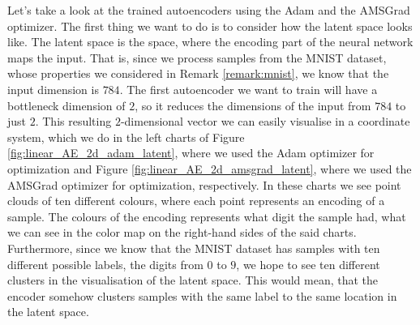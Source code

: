 Let's take a look at the trained autoencoders using the Adam and the AMSGrad optimizer. The first thing we want to do is to consider how the latent space looks like. The latent space is the space, where the encoding part of the neural network maps the input. That is, since we process samples from the MNIST dataset, whose properties we considered in Remark \ref{remark:mnist}, we know that the input dimension is $784$. The first autoencoder we want to train will have a bottleneck dimension of $2$, so it reduces the dimensions of the input from $784$ to just $2$. This resulting $2$-dimensional vector we can easily visualise in a coordinate system, which we do in the left charts of Figure \ref{fig:linear_AE_2d_adam_latent}, where we used the Adam optimizer for optimization and Figure \ref{fig:linear_AE_2d_amsgrad_latent}, where we used the AMSGrad optimizer for optimization, respectively. In these charts we see point clouds of ten different colours, where each point represents an encoding of a sample. The colours of the encoding represents what digit the sample had, what we can see in the color map on the right-hand sides of the said charts. Furthermore, since we know that the MNIST dataset has samples with ten different possible labels, the digits from $0$ to $9$, we hope to see ten different clusters in the visualisation of the latent space. This would mean, that the encoder somehow \glqq clusters\grqq{} samples with the same label to the same location in the latent space.

